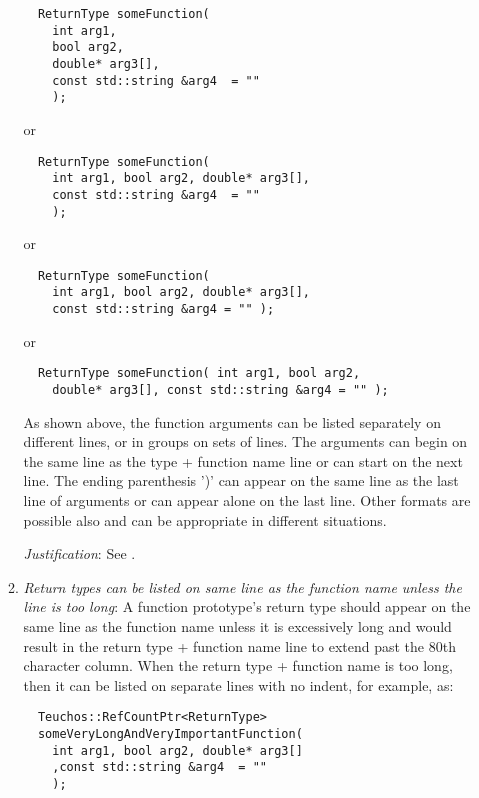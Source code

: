 \begin{enumerate}
\begin{enumerate}
  {\small\begin{verbatim}
  ReturnType someFunction(
    int arg1,
    bool arg2,
    double* arg3[],
    const std::string &arg4  = ""
    );
  \end{verbatim}}
  
  or
  
  {\small\begin{verbatim}
  ReturnType someFunction(
    int arg1, bool arg2, double* arg3[],
    const std::string &arg4  = ""
    );
  \end{verbatim}}
  
  or
  
  {\small\begin{verbatim}
  ReturnType someFunction(
    int arg1, bool arg2, double* arg3[],
    const std::string &arg4 = "" );
  \end{verbatim}}
  
  or
  
  {\small\begin{verbatim}
  ReturnType someFunction( int arg1, bool arg2,
    double* arg3[], const std::string &arg4 = "" );
  \end{verbatim}}

  As shown above, the function arguments can be listed separately on different
  lines, or in groups on sets of lines.  The arguments can begin on the same
  line as the type + function name line or can start on the next line.  The
  ending parenthesis ')' can appear on the same line as the last line of
  arguments or can appear alone on the last line.  Other formats are possible
  also and can be appropriate in different situations.

  {}\textit{Justification}: See {}\cite[Section 31.1]{CodeComplete2nd04}.
  
  {}\item\textit{Return types can be listed on same line as the function name
  unless the line is too long}: A function prototype's return type should
  appear on the same line as the function name unless it is excessively long
  and would result in the return type + function name line to extend past the
  80th character column.  When the return type + function name is too long,
  then it can be listed on separate lines with no indent, for example, as:
  
  {\small\begin{verbatim}
  Teuchos::RefCountPtr<ReturnType>
  someVeryLongAndVeryImportantFunction(
    int arg1, bool arg2, double* arg3[]
    ,const std::string &arg4  = ""
    );
  \end{verbatim}}


\end{enumerate}
\end{enumerate}
